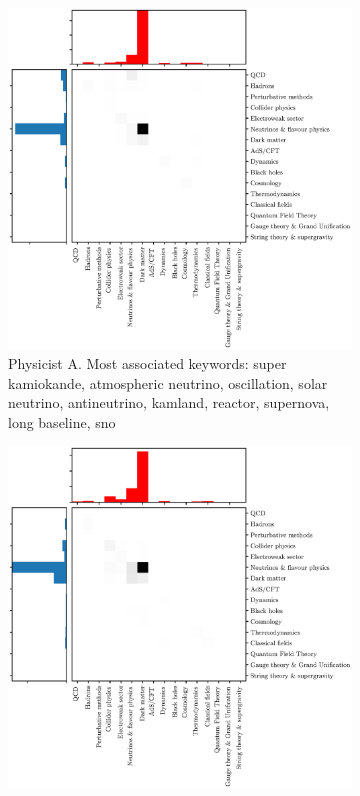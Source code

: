 \documentclass{article}
\begin{document}
 
\begin{figure}[h]
\begin{subfigure}{.45\textwidth}
    \includegraphics[width=1.15\textwidth]{plots/trajectory_example_S.Ando.1.eps}
    \caption{Physicist A. Most associated keywords: super kamiokande, atmospheric neutrino, oscillation, solar neutrino, antineutrino, kamland, reactor, supernova, long baseline, sno}
    \label{fig:S.Ando.1}
\end{subfigure}\hfill%
\begin{subfigure}{0.45\textwidth}
    \includegraphics[width=1.15\textwidth]{plots/trajectory_example_J.F.Beacom.1.eps}

\end{subfigure}
\end{figure}
\end{document}
